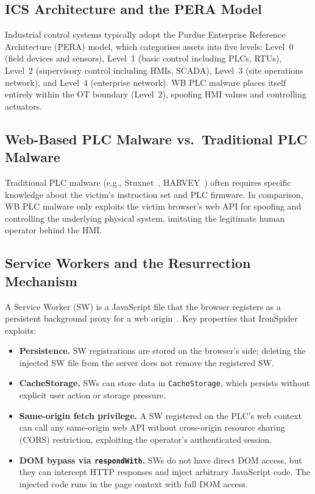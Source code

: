 \documentclass[conference]{IEEEtran}
\begin{document}
\subsection{ICS Architecture and the PERA Model}

Industrial control systems typically adopt the Purdue Enterprise Reference Architecture (PERA) model, which categorises assets into five levels: Level~0 (field devices and sensors),
Level~1 (basic control including PLCs, RTUs), Level~2 (supervisory control including
HMIs, SCADA), Level~3 (site operations network), and Level~4 (enterprise
network). WB PLC malware places itself entirely within the OT boundary (Level~2), spoofing HMI values and controlling actuators.

\subsection{Web-Based PLC Malware vs.\ Traditional PLC Malware}

Traditional PLC malware (e.g., Stuxnet~\cite{stuxnet},
HARVEY~\cite{harvey2017}) often requires specific knowledge about the victim's instruction set and PLC firmware. In comparison, WB PLC malware only exploits the victim browser's web API for spoofing and controlling the underlying physical system, imitating the legitimate human operator behind the HMI.

\subsection{Service Workers and the Resurrection Mechanism}

A Service Worker (SW) is a JavaScript file that the browser registers as a persistent background proxy for a web origin~\cite{w3c-sw}. Key properties that IronSpider exploits:

\begin{itemize}
  \item \textbf{Persistence.}
        SW registrations are stored on the browser's side; deleting the injected SW file from the server does not remove the registered SW.
  \item \textbf{CacheStorage.} SWs can store data in
        \texttt{CacheStorage}, which persists without explicit user action or storage pressure.
  \item \textbf{Same-origin fetch privilege.} 
        A SW registered on the PLC's web context can call any same-origin web API without cross-origin resource sharing (CORS) restriction, exploiting the operator's authenticated session.
  \item \textbf{DOM bypass via \texttt{respondWith}.} 
        SWs do not have direct DOM access, but they can intercept HTTP responses and inject arbitrary JavaScript code. The injected code runs in the page context with full DOM access.
\end{itemize}
\end{document}
